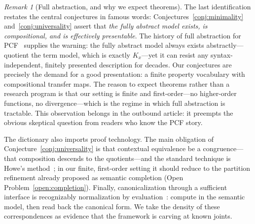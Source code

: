 \documentclass[sigconf,nonacm]{acmart}
\theoremstyle{definition}
\theoremstyle{plain}
\theoremstyle{remark}
\newtheorem{remark}[definition]{Remark}
\begin{document}
\begin{remark}[Full abstraction, and why we expect theorems]
The last identification restates the central conjectures in famous
words: Conjectures~\ref{conj:minimality}
and~\ref{conj:universality} assert that \emph{the fully abstract
model exists, is compositional, and is effectively presentable}.
The history of full abstraction for PCF~\cite{plotkin1977} supplies
the warning: the fully abstract model always exists
abstractly---quotient the term model, which is exactly
\(K_x\)---yet it can resist any syntax-independent, finitely
presented description for decades.  Our conjectures are precisely
the demand for a good presentation: a finite property vocabulary
with compositional transfer maps.  The reason to expect theorems
rather than a research program is that our setting is finite and
first-order---no higher-order functions, no divergence---which is
the regime in which full abstraction is tractable.  This observation
belongs in the outbound article: it preempts the obvious skeptical
question from readers who know the PCF story.
\end{remark}

The dictionary also imports proof technology.  The main obligation
of Conjecture~\ref{conj:universality} is that contextual equivalence
be a congruence---that composition descends to the quotients---and
the standard technique is Howe's method~\cite{howe1996proving}; in
our finite, first-order setting it should reduce to the partition
refinement already proposed as semantic completion
(Open Problem~\ref{open:completion}).  Finally, canonicalization
through a sufficient interface is recognizably normalization by
evaluation~\cite{berger1991inverse}: compute in the semantic model,
then read back the canonical form.  We take the density of these
correspondences as evidence that the framework is carving at known
joints.
\end{document}
